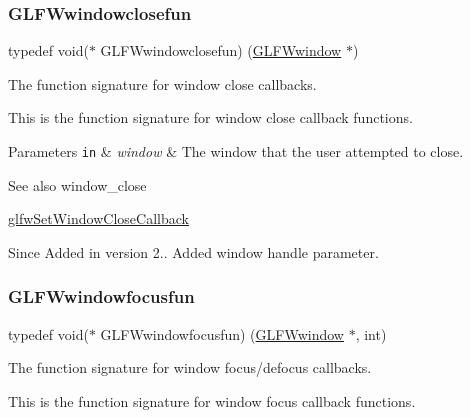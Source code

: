 \subsubsection{\texorpdfstring{G\+L\+F\+Wwindowclosefun}{GLFWwindowclosefun}}
{\footnotesize\ttfamily typedef void($\ast$  G\+L\+F\+Wwindowclosefun) (\hyperlink{group__window_ga3c96d80d363e67d13a41b5d1821f3242}{G\+L\+F\+Wwindow} $\ast$)}



The function signature for window close callbacks. 

This is the function signature for window close callback functions.


\begin{DoxyParams}[1]{Parameters}
\mbox{\tt in}  & {\em window} & The window that the user attempted to close.\\
\hline
\end{DoxyParams}
\begin{DoxySeeAlso}{See also}
window\+\_\+close 

\hyperlink{group__window_ga5b827da350141c789acd64f5c4f7a0e1}{glfw\+Set\+Window\+Close\+Callback}
\end{DoxySeeAlso}
\begin{DoxySince}{Since}
Added in version 2..  Added window handle parameter. 
\end{DoxySince}
\mbox{\label{group__window_ga58be2061828dd35080bb438405d3a7e2}} 
\subsubsection{\texorpdfstring{G\+L\+F\+Wwindowfocusfun}{GLFWwindowfocusfun}}
{\footnotesize\ttfamily typedef void($\ast$  G\+L\+F\+Wwindowfocusfun) (\hyperlink{group__window_ga3c96d80d363e67d13a41b5d1821f3242}{G\+L\+F\+Wwindow} $\ast$, int)}



The function signature for window focus/defocus callbacks. 

This is the function signature for window focus callback functions.


